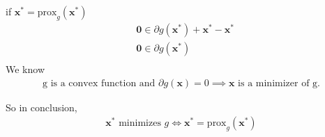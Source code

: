 \documentclass{article}
\begin{document}
\noindent
if \(\bm{x}^* = \text{prox}_g(\bm{x}^*)\)
\begin{align*}
    &\bm{0} \in \partial g(\bm{\bm{x}^*}) + \bm{\bm{x}^*} - \bm{x^*} \\
    &\bm{0} \in \partial g(\bm{\bm{x}^*}) \\
\end{align*}
We know
\begin{align*}
    \text{g is a convex function and } \partial g(\bm{x}) = 0 \implies \bm{x} \text{ is a minimizer of g.}
\end{align*}

So in conclusion, 
\begin{align*}
     \bm{x}^* \text{ minimizes } g \iff \bm{x}^* = \text{prox}_g(\bm{x}^*)
\end{align*}
\end{document}
